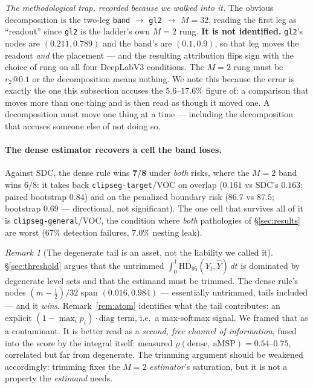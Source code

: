 \documentclass[11pt]{article}
\theoremstyle{remark}
\newtheorem{remark}{Remark}
\newcommand{\Yhat}{\widehat{Y}}
\newcommand{\HDF}{\mathrm{HD}_{95}}
\newcommand{\diag}{\mathrm{diag}}
\begin{document}
\emph{The methodological trap, recorded because we walked into it.} The obvious
decomposition is the two-leg \texttt{band} $\to$ \texttt{gl2} $\to$ $M{=}32$, reading the
first leg as ``readout'' since \texttt{gl2} is the ladder's own $M{=}2$ rung. \textbf{It
is not identified.} \texttt{gl2}'s nodes are $(0.211, 0.789)$ and the band's are $(0.1,
0.9)$, so that leg moves the readout \emph{and} the placement --- and the resulting
attribution flips sign with the choice of rung on all four DeepLabV3 conditions. The
$M{=}2$ rung must be $r_2@0.1$ or the decomposition means nothing. We note this because
the error is exactly the one this subsection accuses the $5.6$--$17.6\%$ figure of: a
comparison that moves more than one thing and is then read as though it moved one. A
decomposition must move one thing at a time --- including the decomposition that accuses
someone else of not doing so.

\paragraph{The dense estimator recovers a cell the band loses.} Against SDC, the
dense rule wins $\mathbf{7/8}$ under \emph{both} risks, where the $M=2$ band wins
$6/8$: it takes back \texttt{clipseg-target}/VOC on overlap ($0.161$ vs SDC's
$0.163$; paired bootstrap $0.84$) and on the penalized boundary risk ($86.7$ vs
$87.5$; bootstrap $0.69$ --- directional, not significant). The one cell that
survives all of it is \texttt{clipseg-general}/VOC, the condition where \emph{both}
pathologies of \S\ref{sec:results} are worst ($67\%$ detection failures, $7.0\%$
nesting leak).

\begin{remark}[The degenerate tail is an asset, not the liability we called it]
\S\ref{sec:threshold} argues that the untrimmed $\int_0^1 \HDF(Y_t,\Yhat)\,dt$ is
dominated by degenerate level sets and that the estimand must be trimmed. The dense
rule's nodes $(m-\tfrac12)/32$ span $(0.016, 0.984)$ --- essentially untrimmed, tails
included --- and it \emph{wins}. Remark~\ref{rem:atom} identifies what the tail
contributes: an explicit $(1-\max_i p_i)\cdot\diag$ term, i.e.\ a max-softmax signal.
We framed that as a contaminant. It is better read as a \emph{second, free channel of
information}, fused into the score by the integral itself: measured
$\rho(\text{dense},\ \text{aMSP}) = 0.54$--$0.75$, correlated but far from degenerate.
The trimming argument should be weakened accordingly: trimming fixes the $M=2$
\emph{estimator}'s saturation, but it is not a property the \emph{estimand} needs.
\end{remark}
\end{document}
